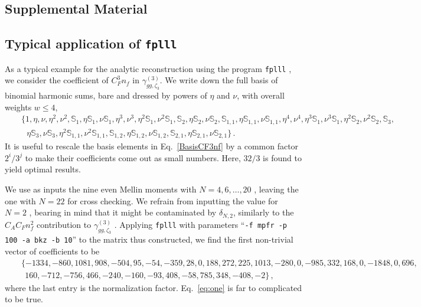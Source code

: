 \documentclass[
 twocolumn,
 superscriptaddress,
 preprintnumbers,
 nofootinbib,
 amsmath,amssymb,
 aps,
 prl
 ]{revtex4-2}
\newcommand{\BS}{\mathbb{S}}
\def\nf{n_f}
\begin{document}
\renewcommand{\theequation}{A.\arabic{equation}}
\setcounter{equation}{0}
\renewcommand{\thefigure}{A.\arabic{figure}}
\setcounter{figure}{0}
\renewcommand{\thetable}{A.\arabic{table}}
\setcounter{table}{0}

\begin{widetext}
\setcounter{secnumdepth}{2}
\section{Supplemental Material}


\subsection{Typical application of \texttt{\textbf{fplll}}}
\label{supplement:1}

As a typical example for the analytic reconstruction using the program \texttt{fplll} \cite{fplll}, we consider the coefficient of $C_F^3\nf$ in $\gamma^{(3)}_{gg,\zeta_3}$.
We write down the full basis of binomial harmonic sums, bare and dressed by powers of $\eta$ and $\nu$, with overall weights $w\le4$,
\begin{eqnarray}
&&\{1, \eta, \nu, \eta^2, \nu^2, \BS_{1}, \eta \BS_{1},
 \nu \BS_{1}, \eta^3, \nu^3, \eta^2 \BS_{1}, \nu^2 \BS_{1}, \BS_{2},
 \eta \BS_{2}, \nu \BS_{2}, \BS_{1, 1}, \eta \BS_{1, 1},
 \nu \BS_{1, 1}, \eta^4, \nu^4, \eta^3 \BS_{1}, \nu^3 \BS_{1},
 \eta^2 \BS_{2}, \nu^2 \BS_{2}, \BS_{3}, \nonumber\\&&\ \ \
 \eta \BS_{3}, \nu \BS_{3}, \eta^2 \BS_{1, 1}, \nu^2 \BS_{1, 1}, \BS_{1, 2}, \eta \BS_{1, 2},
 \nu \BS_{1, 2}, \BS_{2, 1}, \eta \BS_{2, 1}, \nu \BS_{2, 1}\}\,.
 \label{BasisCF3nf}
\end{eqnarray}
It is useful to rescale the basis elements in Eq.~\eqref{BasisCF3nf} by a common factor $2^i/3^j$ to make their coefficients come out as small numbers.
Here, $32/3$ is found to yield optimal results.

We use as inputs the nine even Mellin moments with $N=4,6,\ldots,20$ \cite{Moch:2021qrk,Moch:2023tdj,Falcioni:2024qpd}, leaving the one with $N=22$ \cite{Falcioni:2025hfz} for cross checking.
We refrain from inputting the value for $N=2$ \cite{Moch:2021qrk}, bearing in mind that it might be contaminated by $\delta_{N,2}$, similarly to the $C_AC_Fn_f^2$ contribution to $\gamma_{gg,\zeta_3}^{(3)}$ \cite{Falcioni:2024qpd}.
Applying \texttt{fplll} with parameters ``\texttt{-f mpfr -p 100 -a bkz -b 10}'' to the matrix thus constructed, we find the first non-trivial vector of coefficients to be
\begin{eqnarray}
&&\{-1334,-860,1081,908,-504,95,-54,-359,28,0,188,272,225,1013,-280,0,-985,332,168,0,-1848,0,696,
\nonumber\\&&\ \  160,-712,-756,466,-240,-160,-93,408,-58,785,348,-408,-2\}\,,
\label{eq:one}
\end{eqnarray}
where the last entry is the normalization factor.
Eq.~\eqref{eq:one} is far to complicated to be true.


\end{widetext}
\end{document}
